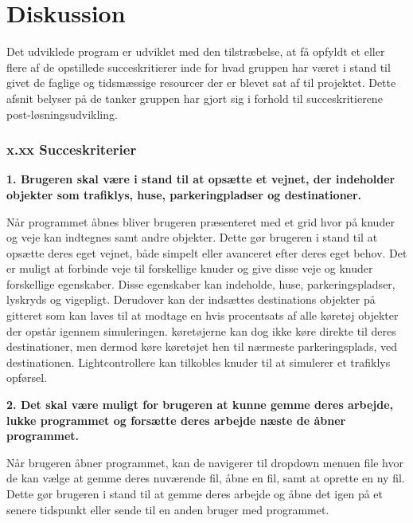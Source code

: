 \chapter{Diskussion}\label{Diskussion}



Det udviklede program er udviklet med den tilstræbelse, at få opfyldt et eller flere af de opstillede succeskritierer inde for hvad gruppen har været i stand til givet de faglige og tidsmæssige resourcer der er blevet sat af til projektet. Dette afsnit belyser på de tanker gruppen har gjort sig i forhold til succeskritierene post-løsningsudvikling.

\subsection{x.xx Succeskriterier}

\textbf{1. Brugeren skal være i stand til at opsætte et vejnet, der indeholder objekter som trafiklys, huse, parkeringpladser og destinationer.}

Når programmet åbnes bliver brugeren præsenteret med et grid hvor på knuder og veje kan indtegnes samt andre objekter. Dette gør brugeren i stand til at opsætte deres eget vejnet, både simpelt eller avanceret efter deres eget behov. Det er muligt at forbinde veje til forskellige knuder og give disse veje og knuder forskellige egenskaber. Disse egenskaber kan indeholde, huse, parkeringspladser, lyskryds og vigepligt. Derudover kan der indsættes destinations objekter på gitteret som kan laves til at modtage en hvis procentsats af alle køretøj objekter der opstår igennem simuleringen. køretøjerne kan dog ikke køre direkte til deres destinationer, men dermod køre køretøjet hen til nærmeste parkeringsplads, ved destinationen. Lightcontrollere kan tilkobles knuder til at simulerer et trafiklys opførsel.

\vspace{5mm}

\textbf{2. Det skal være muligt for brugeren at kunne gemme deres arbejde, lukke programmet og forsætte deres arbejde næste de åbner programmet.}

Når brugeren åbner programmet, kan de navigerer til dropdown menuen file hvor de kan vælge at gemme deres nuværende fil, åbne en fil, samt at oprette en ny fil. Dette gør brugeren i stand til at gemme deres arbejde og åbne det igen på et senere tidspunkt eller sende til en anden bruger med programmet.

\vspace{5mm}

